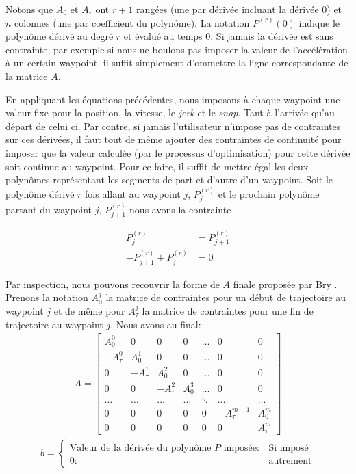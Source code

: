 Notons que $A_0$ et $A_\tau$ ont $r+1$ rangées (une par dérivée incluant la dérivée 0) et $n$ colonnes (une par coefficient du polynôme). La notation $P^{(r)}(0)$ indique le polynôme dérivé au degré $r$ et évalué au temps $0$. Si jamais la dérivée est sans contrainte, par exemple si nous ne boulons pas imposer la valeur de l'accélération à un certain waypoint, il suffit simplement d'ommettre la ligne correspondante de la matrice $A$.

En appliquant les équations précédentes, nous imposons à chaque waypoint une valeur fixe pour la position, la vitesse, le \textit{jerk} et le \textit{snap}. Tant à l'arrivée qu'au départ de celui ci. Par contre, si jamais l'utilisateur n'impose pas de contraintes sur ces dérivées, il faut tout de même ajouter des contraintes de continuité pour imposer que la valeur calculée (par le processus d'optimisation) pour cette dérivée soit continue au waypoint. Pour ce faire, il suffit de mettre égal les deux polynômes représentant les segments de part et d'autre d'un waypoint. Soit le polynôme dérivé $r$ fois allant au waypoint $j$, $P_{j}^{(r)}$ et le prochain polynôme partant du waypoint $j$, $P_{j+1}^{(r)}$ nous avons la contrainte

\begin{align*}
	P_{j}^{(r)} &= P_{j+1}^{(r)}\\
	-P_{j+1}^{(r)} + P_{j}^{(r)} &= 0
\end{align*}

Par inspection, nous pouvons recouvrir la forme de $A$ finale proposée par Bry \citep{bry2012control}. Prenons la notation $A_0^j$ la matrice de contraintes pour un début de trajectoire au waypoint $j$ et de même pour $A_\tau^j$ la matrice de contraintes pour une fin de trajectoire au waypoint $j$. Nous avons au final:
\begin{align}
A=  \begin{bmatrix}
		A_0^0	& 0	& 0 & 0 & \ldots & 0 & 0 \\
		-A_\tau^0 & A_0^1 & 0 & 0 & \ldots & 0 & 0 \\
		0 &  -A_\tau^1 & A_0^2 & 0 & \ldots & 0 & 0\\
		0 & 0 & -A_\tau^2 & A_0^3 & \ldots &0 &0 \\
		\ldots & \ldots & \ldots & \ldots & \ddots & \ldots & \ldots \\
		0& 0& 0& 0& 0& -A_\tau^{m-1} & A_0^m \\
				0& 0& 0& 0& 0& 0& A_\tau^m
	\end{bmatrix}
\end{align}
\begin{align}
b = \left\{
  \begin{array}{ll}
    \text{Valeur de la dérivée du polynôme $P$ imposée}: & \text{Si imposé} \\
    0 : & \text{autrement}
  \end{array}
\right.
\end{align}

